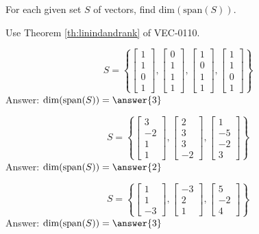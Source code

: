 \documentclass{ximera}
\begin{document}
\begin{problem}
For each given set $S$ of vectors, find $\mbox{dim}(\mbox{span}(S))$.
\begin{hint}
Use Theorem \ref{th:linindandrank} of VEC-0110.
\end{hint}
\begin{problem}\label{prob:finddimension1}
$$S=\left\{\begin{bmatrix}1\\1\\0\\1\end{bmatrix}, \begin{bmatrix}0\\1\\1\\1\end{bmatrix}, \begin{bmatrix}1\\0\\1\\1\end{bmatrix}, \begin{bmatrix}1\\1\\0\\1\end{bmatrix} \right\}$$
Answer: $\mbox{dim}(\mbox{span}(S))=\answer{3}$
\end{problem}

\begin{problem}\label{prob:finddimension2}
$$S=\left\{\begin{bmatrix}3\\-2\\1\\1\end{bmatrix}, \begin{bmatrix}2\\3\\3\\-2\end{bmatrix}, \begin{bmatrix}1\\-5\\-2\\3\end{bmatrix}\right\}$$
Answer: $\mbox{dim}(\mbox{span}(S))=\answer{2}$
\end{problem}

\begin{problem}\label{prob:finddimension3}
$$S=\left\{\begin{bmatrix}1\\1\\-3\end{bmatrix}, \begin{bmatrix}-3\\2\\1\end{bmatrix}, \begin{bmatrix}5\\-2\\4\end{bmatrix}\right\}$$
Answer: $\mbox{dim}(\mbox{span}(S))=\answer{3}$
\end{problem}


\end{problem}
\end{document}
